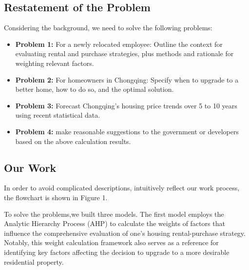 \documentclass{mcmthesis}
\begin{document}
\subsection{Restatement of the Problem} 
Considering the background, we need to solve the following problems:
\begin{itemize}
\item \textbf{Problem 1:} For a newly relocated employee: Outline the context for evaluating rental and purchase strategies, plus methods and rationale for weighting relevant factors. %
\item \textbf{Problem 2:} For homeowners in Chongqing: Specify when to upgrade to a better home, how to do so, and the optimal solution. %
\item \textbf{Problem 3:} Forecast Chongqing's housing price trends over 5 to 10 years using recent statistical data. %
\item \textbf{Problem 4:} make reasonable suggestions to the government or developers based on the above calculation results. %
\end{itemize}


\subsection{Our Work} 


In order to avoid complicated descriptions, intuitively reflect our work process, the flowchart is shown in Figure 1. %

To solve the problems,we built three models. The first model employs the 
Analytic Hierarchy Process (AHP) to calculate the weights of factors 
that influence the comprehensive evaluation of one’s housing rental-purchase strategy. 
Notably, this weight calculation framework also serves as a reference for identifying key factors 
affecting the decision to upgrade to a more desirable residential property.
\end{document}
